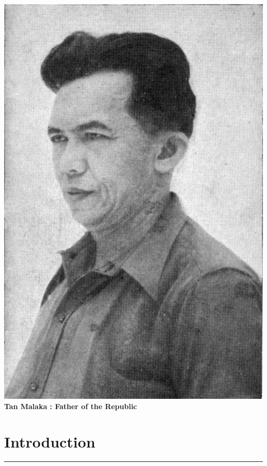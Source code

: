 \documentclass[12pt, oneside, a4paper]{memoir}
\begin{document}
    
    \newpage

    \begin{center}
        \thispagestyle{empty}
        \includegraphics[scale=1]{assets/tan-malaka.png}\\
        \textbf{Tan Malaka : Father of the Republic}
        \newpage
    \end{center}

    \tableofcontents
    \newpage

    \chapter{\centering Introduction}
    \hrule
    \vspace*{1cm}
    
    \newpage
\end{document}
